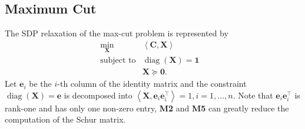 \subsection{Maximum Cut}

The SDP relaxation of the max-cut problem is represented by
\begin{eqnarray*}
  \min_{\mathbf{X}} & \left\langle \mathbf{C}, \mathbf{X} \right\rangle & \\
  \text{subject to} & \ensuremath{\operatorname{diag}} \left( \mathbf{X} \right) = \textbf{1} & \\
  & \mathbf{X} \succeq \textbf{0} . & 
\end{eqnarray*}
Let $\mathbf{e}_i$ be the $i$-th column of the identity matrix and the constraint
$\ensuremath{\operatorname{diag}} \left( \mathbf{X} \right) = \mathbf{e}$ is decomposed into $\left\langle \mathbf{X}, \mathbf{e}_i
\mathbf{e}_i^{\top} \right\rangle = 1, i = 1, \ldots, n$. Note that $\mathbf{e}_i \mathbf{e}_i^{\top}$
is rank-one and has only one non-zero entry, {\textbf{M2}} and
{\textbf{M5}} can greatly reduce the computation of the Schur matrix.


